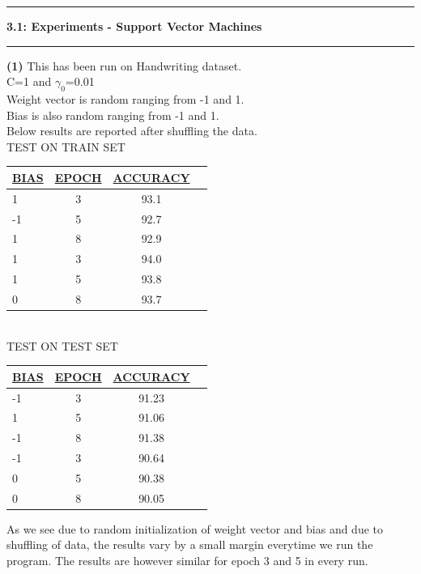 \documentclass[11pt]{article}
\newcommand\question[2]{\vspace{.25in}\hrule\textbf{#1: #2}\vspace{.5em}\hrule\vspace{.10in}}
\renewcommand\part[1]{\vspace{.10in}\textbf{(#1)}}
\begin{document}
\question{3.1}{Experiments - Support Vector Machines}
\part{1}
This has been run on Handwriting dataset.\\
C=1 and $\gamma_{0}$=0.01\\
Weight vector is random ranging from -1 and 1.\\
Bias is also random ranging from -1 and 1.\\
Below results are reported after shuffling the data.\\[15pt]
TEST ON TRAIN SET\\
\bgroup 
\def\arraystretch{1.2}
\begin{tabular}{|l|c|c|c|} \hline 
{\bf \underline {BIAS}} & {\bf \underline {EPOCH}} & {\bf \underline {ACCURACY}} \\ \hline
1 & 3 & 93.1 \\ \hline
-1 & 5 & 92.7 \\ \hline
1 & 8 & 92.9 \\ \hline
1 & 3 & 94.0 \\ \hline
1 & 5 & 93.8 \\ \hline
0 & 8 & 93.7 \\ \hline

\end{tabular}
\egroup\\[20pt]

TEST ON TEST SET\\
\bgroup 
\def\arraystretch{1.2}
\begin{tabular}{|l|c|c|c|} \hline 
{\bf \underline {BIAS}} & {\bf \underline {EPOCH}} & {\bf \underline {ACCURACY}} \\ \hline
-1 & 3 & 91.23 \\ \hline
1 & 5 & 91.06 \\ \hline
-1 & 8 & 91.38 \\ \hline
-1 & 3 & 90.64 \\ \hline
0 & 5 & 90.38 \\ \hline
0 & 8 & 90.05 \\ \hline

\end{tabular}
\egroup

As we see due to random initialization of weight vector and bias and due to shuffling of data, the results vary by a small margin everytime we run the program. The results are however similar for epoch 3 and 5 in every run.
\end{document}

